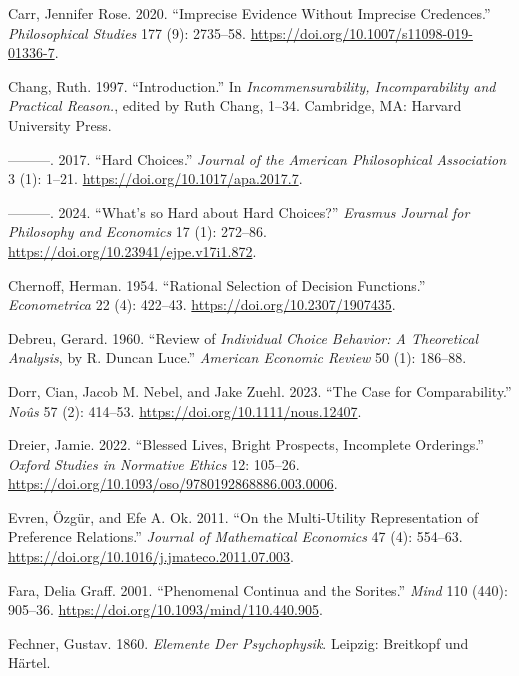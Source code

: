 \documentclass[
  10.5pt,
  twoside]{article}
\newlength{\cslhangindent}
\newenvironment{CSLReferences}[2] %
 {\begin{list}{}{%
  \setlength{\itemindent}{0pt}
  \setlength{\leftmargin}{0pt}
  \setlength{\parsep}{0pt}
  \ifodd #1
   \setlength{\leftmargin}{\cslhangindent}
   \setlength{\itemindent}{-1\cslhangindent}
  \fi
  \setlength{\itemsep}{#2\baselineskip}}}
 {\end{list}}
\begin{document}
\begin{CSLReferences}{1}{0}
Carr, Jennifer Rose. 2020. {``Imprecise Evidence Without Imprecise
Credences.''} \emph{Philosophical Studies} 177 (9): 2735--58.
\url{https://doi.org/10.1007/s11098-019-01336-7}.

Chang, Ruth. 1997. {``Introduction.''} In \emph{Incommensurability,
Incomparability and Practical Reason.}, edited by Ruth Chang, 1--34.
Cambridge, MA: Harvard University Press.

---------. 2017. {``Hard Choices.''} \emph{Journal of the American
Philosophical Association} 3 (1): 1--21.
\url{https://doi.org/10.1017/apa.2017.7}.

---------. 2024. {``What's so Hard about Hard Choices?''} \emph{Erasmus
Journal for Philosophy and Economics} 17 (1): 272--86.
\url{https://doi.org/10.23941/ejpe.v17i1.872}.

Chernoff, Herman. 1954. {``Rational Selection of Decision Functions.''}
\emph{Econometrica} 22 (4): 422--43.
\url{https://doi.org/10.2307/1907435}.

Debreu, Gerard. 1960. {``Review of \emph{Individual Choice Behavior: A
Theoretical Analysis}, by {R. Duncan Luce}.''} \emph{American Economic
Review} 50 (1): 186--88.

Dorr, Cian, Jacob M. Nebel, and Jake Zuehl. 2023. {``The Case for
Comparability.''} \emph{Noûs} 57 (2): 414--53.
\url{https://doi.org/10.1111/nous.12407}.

Dreier, Jamie. 2022. {``Blessed Lives, Bright Prospects, Incomplete
Orderings.''} \emph{Oxford Studies in Normative Ethics} 12: 105--26.
\url{https://doi.org/10.1093/oso/9780192868886.003.0006}.

Evren, Özgür, and Efe A. Ok. 2011. {``On the Multi-Utility
Representation of Preference Relations.''} \emph{Journal of Mathematical
Economics} 47 (4): 554--63.
\url{https://doi.org/10.1016/j.jmateco.2011.07.003}.

Fara, Delia Graff. 2001. {``Phenomenal Continua and the Sorites.''}
\emph{Mind} 110 (440): 905--36.
\url{https://doi.org/10.1093/mind/110.440.905}.

Fechner, Gustav. 1860. \emph{Elemente Der Psychophysik}. Leipzig:
Breitkopf und H{ä}rtel.


\end{CSLReferences}
\end{document}
